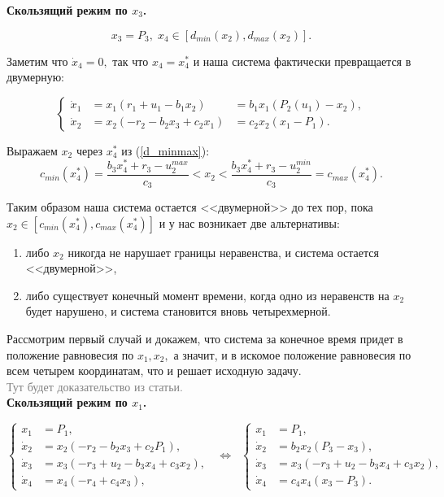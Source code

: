 \documentclass[11pt]{article}
\newcommand\Ref[1]{(\ref{#1})}
\newcommand\beq{\begin{equation}}
\newcommand\eeq{\end{equation}}
\begin{document}
{\bf Скользящий режим по $x_3$.}

\beq
\label{d_minmax}
	x_3 = P_3, \; x_4 \in [d_{min}(x_2), d_{max}(x_2)].
\eeq

Заметим что $\dot x_4 = 0,$ так что $x_4 = x_4^*$ и наша система фактически превращается в двумерную:

$$
\left\{
\begin{aligned}
	\dot x_1 &= x_1(r_1 + u_1- b_1x_2) &= b_1x_1(P_2(u_1) - x_2), \\
	\dot x_2 &= x_2(-r_2 - b_2x_3 + c_2x_1) &= c_2x_2(x_1 - P_1).
\end{aligned}
\right.
$$

Выражаем $x_2$ через $x_4^*$ из \Ref{d_minmax}:
$$c_{min}(x_4^*) = \frac{b_3x_4^* + r_3 - u_2^{max}}{c_3} < x_2 < \frac{b_3x_4^* + r_3 - u_2^{min}}{c_3} = c_{max}(x_4^*).$$

Таким образом наша система остается <<двумерной>> до тех пор, пока $x_2 \in [c_{min}(x_4^*), c_{max}(x_4^*)]$ и у нас возникает две альтернативы:
\begin{enumerate}
	\item либо $x_2$ никогда не нарушает границы неравенства, и система остается <<двумерной>>,
	\item либо существует конечный момент времени, когда одно из неравенств на $x_2$ будет нарушено, и система становится вновь четырехмерной.
\end{enumerate}

Рассмотрим первый случай и докажем, что система за конечное время придет в положение равновесия по $x_1, x_2,$ а значит, и в искомое положение равновесия по всем четырем координатам, что и решает исходную задачу. \\

\textcolor{gray}{Тут будет доказательство из статьи.}\\

{\bf Скользящий режим по $x_1$.}

\beq
\left\{
\begin{aligned}
	x_1 &= P_1, \\
	\dot x_2 &= x_2(-r_2 - b_2x_3 + c_2P_1), \\
	\dot x_3 &= x_3(-r_3 + u_2 - b_3x_4 + c_3x_2), \\
	\dot x_4 &= x_4(-r_4 + c_4x_3), 
\end{aligned}
\right. \;\; \Leftrightarrow \;\;
\left\{
\begin{aligned}
	x_1 &= P_1, \\
	\dot x_2 &= b_2x_2(P_3 - x_3), \\
	\dot x_3 &= x_3(-r_3 + u_2 - b_3x_4 + c_3x_2), \\
	\dot x_4 &= c_4x_4(x_3 - P_3). 	
\end{aligned}
\label{system1}
\right.
\eeq
\end{document}
